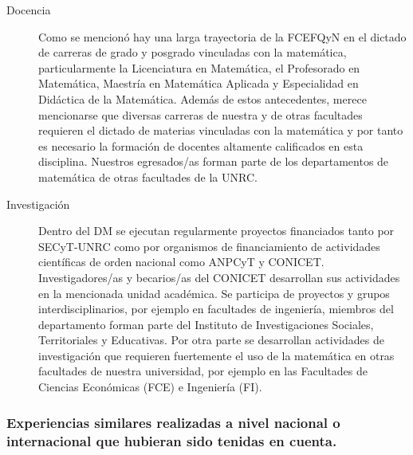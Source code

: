\documentclass[a4paper, 12pt]{article}
\begin{document}
\begin{description}
 \item[Docencia] Como se mencionó hay una larga trayectoria  de la FCEFQyN en el dictado de carreras de grado y posgrado  vinculadas con la matemática, particularmente la Licenciatura en Matemática, el Profesorado en Matemática, Maestría en Matemática Aplicada y Especialidad en Didáctica de la Matemática. Además de estos antecedentes, merece mencionarse que diversas carreras de nuestra y de otras facultades requieren el dictado de materias vinculadas con la matemática y por tanto es necesario la formación de docentes altamente calificados en esta disciplina. Nuestros egresados/as forman parte de los departamentos de matemática de otras facultades de la UNRC.
 
 \item[Investigación] Dentro del DM     se ejecutan regularmente  proyectos financiados tanto por SECyT-UNRC como por organismos de financiamiento de actividades científicas de orden  nacional como ANPCyT y CONICET. Investigadores/as y becarios/as del CONICET desarrollan sus actividades en la mencionada unidad académica. Se participa de proyectos y grupos interdisciplinarios, por ejemplo en  facultades de ingeniería, miembros del departamento forman parte  del Instituto de Investigaciones Sociales, Territoriales y  Educativas. Por otra parte se desarrollan actividades de investigación que requieren fuertemente el uso de la matemática en otras facultades de nuestra universidad, por ejemplo en las Facultades de Ciencias Económicas (FCE) e Ingeniería (FI).
 

 
 
\end{description}






\subsubsection{Experiencias similares realizadas a nivel nacional o internacional que hubieran sido tenidas en cuenta.}
\end{document}
